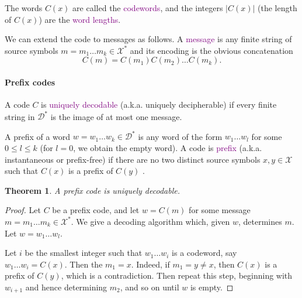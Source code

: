 \documentclass[a4paper, 11pt, openany]{article}
\numberwithin{equation}{section}
\theoremstyle{plain}
\newtheorem{theorem}	[equation]	{Theorem}
\theoremstyle{definition}
\newcommand{\Define}[1]{\textcolor{purple}{#1}}
\begin{document}
The words $C(x)$ are called the \Define{codewords}, and the integers $|C(x)|$ (the length of $C(x)$) are the \Define{word lengths}.

We can extend the code to messages as follows. A \Define{message} is any finite string of source symbols $m = m_1 \dots m_k \in \mathcal{X}^*$ and its encoding is the obvious concatenation 
\[
    C(m) = C(m_1) C(m_2) \dots C(m_k).
\]

\paragraph{Prefix codes}


A code $C$ is \Define{uniquely decodable} (a.k.a. uniquely decipherable) if every finite string in $\mathcal{D}^*$ is the image of at most one message. 

A prefix of a word $w = w_1 \dots w_k \in \mathcal{D}^*$ is any word of the form $w_1 \dots w_l$ for some $0 \le l \le k$ (for $l=0$, we obtain the empty word). A code is \Define{prefix} (a.k.a. instantaneous or prefix-free) if there are no two distinct source symbols $x, y \in \mathcal{X}$ such that $C(x)$ is a prefix of  $C(y)$         .

\begin{theorem}
A prefix code is uniquely decodable.
\end{theorem}

\begin{proof}
Let $C$ be a prefix code, and let $w = C(m)$ for some message $m = m_1 \dots m_k \in \mathcal{X}^*$. We give a decoding algorithm which, given $w$, determines $m$. Let $w = w_1 \dots w_l$.

Let $i$ be the smallest integer such that $w_1 \dots w_i$ is a codeword, say $w_1 \dots w_i = C(x)$. Then the $m_1 = x$. Indeed, if $m_1 = y \ne x$, then $C(x)$ is a prefix of $C(y)$, which is a contradiction. Then repeat this step, beginning with $w_{i+1}$ and hence determining $m_2$, and so on until $w$ is empty.
\end{proof}
\end{document}
